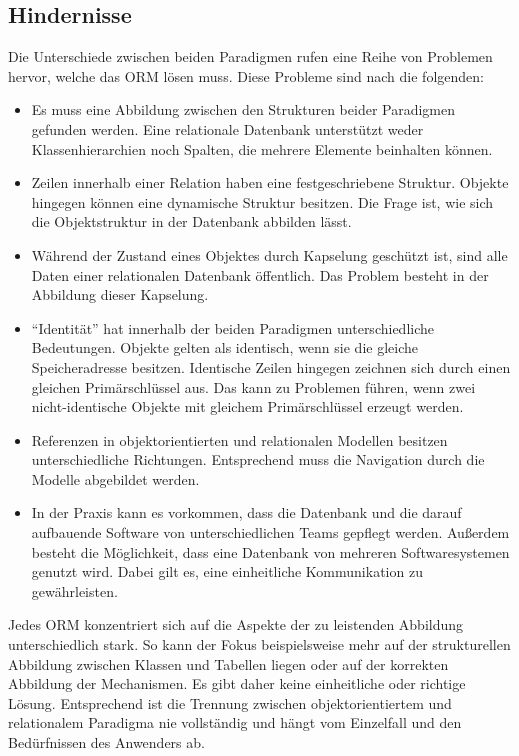 \subsection{Hindernisse}
Die Unterschiede zwischen beiden Paradigmen rufen eine Reihe von Problemen hervor, welche das ORM lösen muss. Diese Probleme sind nach \cite{ireland_understanding_2009} die folgenden:
\begin{itemize}
    \item Es muss eine Abbildung zwischen den Strukturen beider Paradigmen gefunden werden. Eine relationale Datenbank unterstützt weder Klassenhierarchien noch Spalten, die mehrere Elemente beinhalten können.
    \item Zeilen innerhalb einer Relation haben eine festgeschriebene Struktur. Objekte hingegen können eine dynamische Struktur besitzen. Die Frage ist, wie sich die Objektstruktur in der Datenbank abbilden lässt.
    \item Während der Zustand eines Objektes durch Kapselung geschützt ist, sind alle Daten einer relationalen Datenbank öffentlich. Das Problem besteht in der Abbildung dieser Kapselung.
    \item \enquote{Identität} hat innerhalb der beiden Paradigmen unterschiedliche Bedeutungen. Objekte gelten als identisch, wenn sie die gleiche Speicheradresse besitzen. Identische Zeilen hingegen zeichnen sich durch einen gleichen Primärschlüssel aus. Das kann zu Problemen führen, wenn zwei nicht-identische Objekte mit gleichem Primärschlüssel erzeugt werden.
    \item Referenzen in objektorientierten und relationalen Modellen besitzen unterschiedliche Richtungen. Entsprechend muss die Navigation durch die Modelle abgebildet werden.
    \item In der Praxis kann es vorkommen, dass die Datenbank und die darauf aufbauende Software von unterschiedlichen Teams gepflegt werden. Außerdem besteht die Möglichkeit, dass eine Datenbank von mehreren Softwaresystemen genutzt wird. Dabei gilt es, eine einheitliche Kommunikation zu gewährleisten.
\end{itemize}
Jedes ORM konzentriert sich auf die Aspekte der zu leistenden Abbildung unterschiedlich stark. So kann der Fokus beispielsweise mehr auf der strukturellen Abbildung zwischen Klassen und Tabellen liegen oder auf der korrekten Abbildung der Mechanismen. Es gibt daher keine einheitliche oder richtige Lösung. Entsprechend ist die Trennung zwischen objektorientiertem und relationalem Paradigma nie vollständig und hängt vom Einzelfall und den Bedürfnissen des Anwenders ab.


